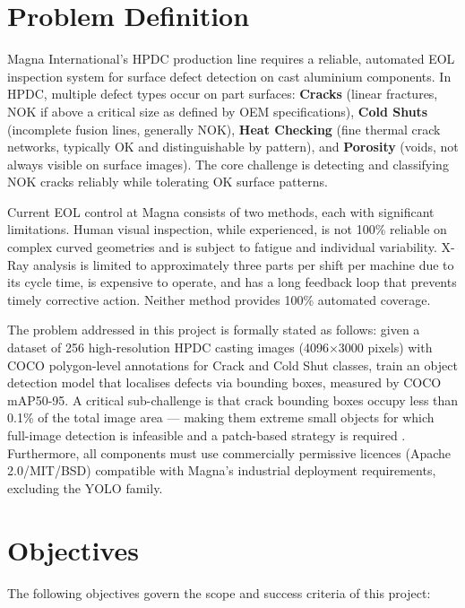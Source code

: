 \section{Problem Definition}

Magna International's HPDC production line requires a reliable, automated EOL inspection system for surface defect detection on cast aluminium components. In HPDC, multiple defect types occur on part surfaces: \textbf{Cracks} (linear fractures, NOK if above a critical size as defined by OEM specifications), \textbf{Cold Shuts} (incomplete fusion lines, generally NOK), \textbf{Heat Checking} (fine thermal crack networks, typically OK and distinguishable by pattern), and \textbf{Porosity} (voids, not always visible on surface images). The core challenge is detecting and classifying NOK cracks reliably while tolerating OK surface patterns.

Current EOL control at Magna consists of two methods, each with significant limitations. Human visual inspection, while experienced, is not 100\% reliable on complex curved geometries and is subject to fatigue and individual variability. X-Ray analysis is limited to approximately three parts per shift per machine due to its cycle time, is expensive to operate, and has a long feedback loop that prevents timely corrective action. Neither method provides 100\% automated coverage.

The problem addressed in this project is formally stated as follows: given a dataset of 256 high-resolution HPDC casting images (4096$\times$3000 pixels) with COCO polygon-level annotations for Crack and Cold Shut classes, train an object detection model that localises defects via bounding boxes, measured by COCO mAP50-95. A critical sub-challenge is that crack bounding boxes occupy less than 0.1\% of the total image area --- making them extreme small objects for which full-image detection is infeasible and a patch-based strategy is required \cite{lin2014}. Furthermore, all components must use commercially permissive licences (Apache 2.0/MIT/BSD) compatible with Magna's industrial deployment requirements, excluding the YOLO family.

\section{Objectives}

The following objectives govern the scope and success criteria of this project:

